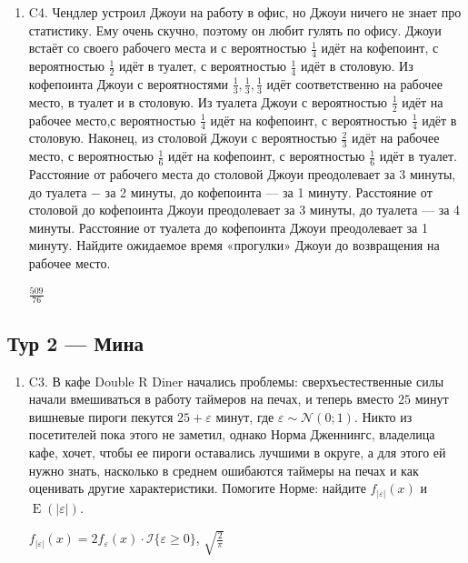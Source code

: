 \documentclass[12pt]{article}
\DeclareMathOperator{\E}{E}
\newenvironment{problem}{}{}
\newenvironment{sol}{}{} %
\begin{document}
\begin{enumerate}
\begin{problem}
\item[C4.] Чендлер устроил Джоуи на работу в офис, но Джоуи ничего не знает про статистику. Ему очень скучно, поэтому он любит гулять по офису. Джоуи встаёт со своего рабочего места и с вероятностью $\frac{1}{4}$ идёт на кофепоинт, с вероятностью $\frac{1}{2}$ идёт в туалет, с вероятностью $\frac{1}{4}$ идёт в столовую. Из кофепоинта Джоуи с вероятностями $\frac{1}{3}, \frac{1}{3},\frac{1}{3}$ идёт соответственно на рабочее место, в туалет и в столовую. Из туалета Джоуи с вероятностью $\frac{1}{2}$ идёт на рабочее место,с вероятностью $\frac{1}{4}$ идёт на кофепоинт, с вероятностью $\frac{1}{4}$ идёт в столовую. Наконец, из столовой Джоуи с вероятностью $\frac{2}{3}$ идёт на рабочее место, с вероятностью $\frac{1}{6}$ идёт на кофепоинт, с вероятностью $\frac{1}{6}$ идёт в туалет. Расстояние от рабочего места до столовой Джоуи преодолевает за 3 минуты, до туалета $-$ за 2 минуты, до кофепоинта — за 1 минуту. Расстояние от столовой до кофепоинта Джоуи преодолевает за 3 минуты, до туалета — за 4 минуты. Расстояние от туалета до кофепоинта Джоуи преодолевает за 1 минуту. Найдите ожидаемое время «прогулки» Джоуи до возвращения на рабочее место. 

\begin{sol}
$\frac{509}{76}$
\end{sol}
\end{problem}
\end{enumerate}

\newpage
\subsection{Тур 2 — Мина}

\begin{enumerate}
\begin{problem}
\item[C3.] В кафе Double R Diner начались проблемы: сверхъестественные силы начали вмешиваться в работу таймеров на печах, и теперь вместо \(25\) минут вишневые пироги пекутся \(25 + \varepsilon\) минут, где \(\varepsilon\sim \mathcal{N}(0;1)\). Никто из посетителей пока этого не заметил, однако Норма Дженнингс, владелица кафе, хочет, чтобы ее пироги оставались лучшими в округе, а для этого ей нужно знать, насколько в среднем ошибаются таймеры на печах и как оценивать другие характеристики. Помогите Норме: найдите $f_{|\varepsilon|}(x)$ и $\E(|\varepsilon|)$.

\begin{sol}
$f_{|\varepsilon|}(x) = 2f_{\varepsilon}(x) \cdot \mathcal{I} \{\varepsilon \geq 0\}$, $\sqrt{\frac{2}{\pi}}$
\end{sol}
\end{problem}
\end{enumerate}
\end{document}
